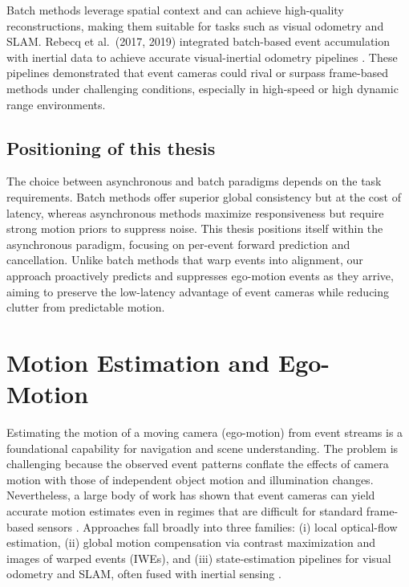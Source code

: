 Batch methods leverage spatial context and can achieve high-quality reconstructions, making them suitable for tasks such as visual odometry and SLAM. Rebecq et al.\ (2017, 2019) integrated batch-based event accumulation with inertial data to achieve accurate visual-inertial odometry pipelines \cite{Rebecq2017,Rebecq2019}. These pipelines demonstrated that event cameras could rival or surpass frame-based methods under challenging conditions, especially in high-speed or high dynamic range environments.

\subsection{Positioning of this thesis}
The choice between asynchronous and batch paradigms depends on the task requirements. Batch methods offer superior global consistency but at the cost of latency, whereas asynchronous methods maximize responsiveness but require strong motion priors to suppress noise. This thesis positions itself within the asynchronous paradigm, focusing on per-event forward prediction and cancellation. Unlike batch methods that warp events into alignment, our approach proactively predicts and suppresses ego-motion events as they arrive, aiming to preserve the low-latency advantage of event cameras while reducing clutter from predictable motion.

\section{Motion Estimation and Ego-Motion}
\label{sec:ego-motion}

Estimating the motion of a moving camera (ego-motion) from event streams is a foundational capability for navigation and scene understanding. The problem is challenging because the observed event patterns conflate the effects of camera motion with those of independent object motion and illumination changes. Nevertheless, a large body of work has shown that event cameras can yield accurate motion estimates even in regimes that are difficult for standard frame-based sensors \cite{Gallego2020Survey}. Approaches fall broadly into three families: (i) local optical-flow estimation, (ii) global motion compensation via contrast maximization and images of warped events (IWEs), and (iii) state-estimation pipelines for visual odometry and SLAM, often fused with inertial sensing \cite{Bardow2016SOFIE,Gallego2018CMax,Rebecq2017EVO,Rebecq2019E2VID}.

